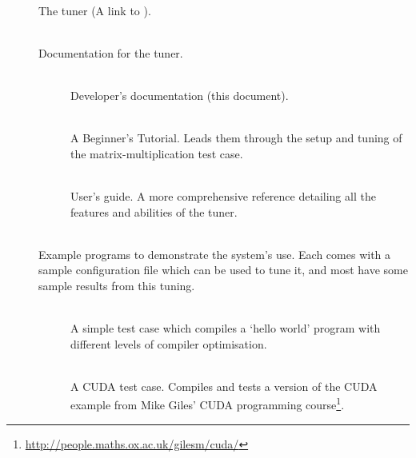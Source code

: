 \documentclass[a4paper, draft]{article}
\begin{document}
\begin{description}


    \item[] \hfill\\
        The tuner (A link to ).
        
    \item[] \hfill\\
        Documentation for the tuner.
        
        \begin{description}
            \item[] \hfill\\
                Developer's documentation (this document).
                
            \item[] \hfill\\
                A Beginner's Tutorial. Leads them through the setup and tuning 
                of the matrix-multiplication test case.
                
            \item[] \hfill\\
                User's guide. A more comprehensive reference detailing all the 
                features and abilities of the tuner.
                
                
        \end{description}
        
        
    \item[] \hfill\\
        Example programs to demonstrate the system's use. Each comes with a 
        sample configuration file which can be used to tune it, and most 
        have some sample results from this tuning.
        
        \begin{description}
            \item[] \hfill\\
                A simple test case which compiles a `hello world' program 
                with different levels of compiler optimisation.
                
            \item[] \hfill\\
                A CUDA test case. Compiles and tests a version of the 
                 CUDA example from Mike Giles' CUDA 
                programming course\footnote{\url{http://people.maths.ox.ac.uk/gilesm/cuda/}}.
                

\end{description}
\end{description}
\end{document}
